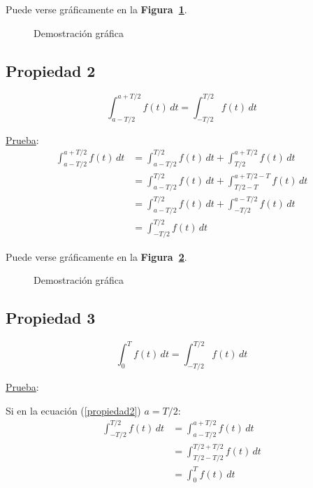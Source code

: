 Puede verse gráficamente en la \textbf{Figura~\ref{figura_02}}.
\begin{figure}[H]
    \centering
    
    \caption{Demostración gráfica}\label{figura_02}
\end{figure}

\subsection*{Propiedad 2}
\begin{equation}
    \int_{a-T/2}^{a+T/2} f(t)\,dt=\int_{-T/2}^{T/2} f(t)\,dt
\label{propiedad2}
\end{equation}

\underline{Prueba}:
\begin{equation*}
\begin{split}
    \int_{a-T/2}^{a+T/2} f(t)\,dt
        &=\int_{a-T/2}^{T/2} f(t)\,dt+\int_{T/2}^{a+T/2} f(t)\,dt\\
        &=\int_{a-T/2}^{T/2} f(t)\,dt+\int_{T/2-T}^{a+T/2-T} f(t)\,dt\\
        &=\int_{a-T/2}^{T/2} f(t)\,dt+\int_{-T/2}^{a-T/2} f(t)\,dt\\
        &=\int_{-T/2}^{T/2} f(t)\,dt
\end{split}
\end{equation*}

Puede verse gráficamente en la \textbf{Figura~\ref{figura_03}}.
\begin{figure}[H]
    \centering
    
    \caption{Demostración gráfica}\label{figura_03}
\end{figure}

\subsection*{Propiedad 3}
\begin{equation}
    \int_{0}^{T} f(t)\,dt=\int_{-T/2}^{T/2} f(t)\,dt
\label{propiedad3}
\end{equation}

\underline{Prueba}:

Si en la ecuación (\ref{propiedad2}) $a=T/2$:
\begin{equation*}
\begin{split}
    \int_{-T/2}^{T/2} f(t)\,dt
        &=\int_{a-T/2}^{a+T/2} f(t)\,dt\\
        &=\int_{T/2-T/2}^{T/2+T/2} f(t)\,dt\\
        &=\int_{0}^{T} f(t)\,dt
\end{split}
\end{equation*}

